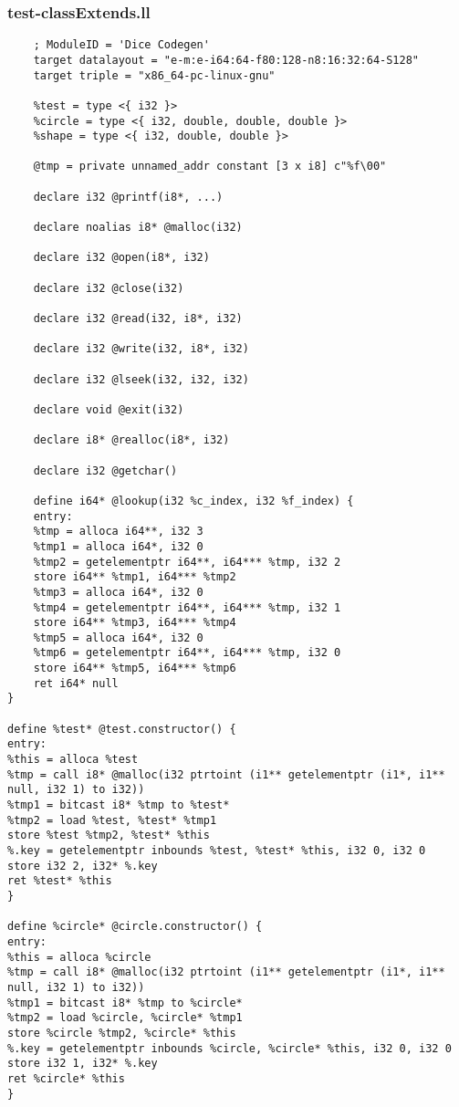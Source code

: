 \subsubsection{test-classExtends.ll}
\begin{verbatim}
	; ModuleID = 'Dice Codegen'
	target datalayout = "e-m:e-i64:64-f80:128-n8:16:32:64-S128"
	target triple = "x86_64-pc-linux-gnu"
	
	%test = type <{ i32 }>
	%circle = type <{ i32, double, double, double }>
	%shape = type <{ i32, double, double }>
	
	@tmp = private unnamed_addr constant [3 x i8] c"%f\00"
	
	declare i32 @printf(i8*, ...)
	
	declare noalias i8* @malloc(i32)
	
	declare i32 @open(i8*, i32)
	
	declare i32 @close(i32)
	
	declare i32 @read(i32, i8*, i32)
	
	declare i32 @write(i32, i8*, i32)
	
	declare i32 @lseek(i32, i32, i32)
	
	declare void @exit(i32)
	
	declare i8* @realloc(i8*, i32)
	
	declare i32 @getchar()
	
	define i64* @lookup(i32 %c_index, i32 %f_index) {
	entry:
	%tmp = alloca i64**, i32 3
	%tmp1 = alloca i64*, i32 0
	%tmp2 = getelementptr i64**, i64*** %tmp, i32 2
	store i64** %tmp1, i64*** %tmp2
	%tmp3 = alloca i64*, i32 0
	%tmp4 = getelementptr i64**, i64*** %tmp, i32 1
	store i64** %tmp3, i64*** %tmp4
	%tmp5 = alloca i64*, i32 0
	%tmp6 = getelementptr i64**, i64*** %tmp, i32 0
	store i64** %tmp5, i64*** %tmp6
	ret i64* null
}

define %test* @test.constructor() {
entry:
%this = alloca %test
%tmp = call i8* @malloc(i32 ptrtoint (i1** getelementptr (i1*, i1** null, i32 1) to i32))
%tmp1 = bitcast i8* %tmp to %test*
%tmp2 = load %test, %test* %tmp1
store %test %tmp2, %test* %this
%.key = getelementptr inbounds %test, %test* %this, i32 0, i32 0
store i32 2, i32* %.key
ret %test* %this
}

define %circle* @circle.constructor() {
entry:
%this = alloca %circle
%tmp = call i8* @malloc(i32 ptrtoint (i1** getelementptr (i1*, i1** null, i32 1) to i32))
%tmp1 = bitcast i8* %tmp to %circle*
%tmp2 = load %circle, %circle* %tmp1
store %circle %tmp2, %circle* %this
%.key = getelementptr inbounds %circle, %circle* %this, i32 0, i32 0
store i32 1, i32* %.key
ret %circle* %this
}


\end{verbatim}
